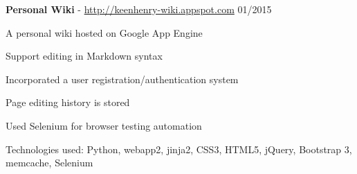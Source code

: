 \documentclass[margin,line]{resume}
\begin{document}
\begin{resume}
    \textbf{Personal Wiki} - \url{http://keenhenry-wiki.appspot.com} \hfill 01/2015 \vspace{-3mm}\\\vspace{-1mm}%
      \begin{list2}
       \item A personal wiki hosted on Google App Engine
       \item Support editing in Markdown syntax
       \item Incorporated a user registration/authentication system
       \item Page editing history is stored
       \item Used Selenium for browser testing automation
       \item Technologies used: Python, webapp2, jinja2, CSS3, HTML5, jQuery, Bootstrap 3, memcache, Selenium
      \end{list2}




\end{resume}
\end{document}
